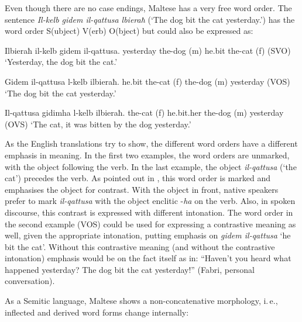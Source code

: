 \begin{multicols}{2}

Even though there are no case endings, Maltese has a very free word order. The sentence \emph{Il-kelb gidem il-qattusa lbieraħ} (`The dog bit the cat yesterday.') has the word order S(ubject) V(erb) O(bject) but could also be expressed as:

\begin{examples}\label{WO_no_clitics_en}
\item
\gll Ilbieraħ il-kelb gidem il-qattusa.
yesterday	{the-dog (m)} he.bit	{the-cat (f)}
\gln (SVO)
\glt `Yesterday, the dog bit the cat.'
\glend

\item
\gll Gidem il-qattusa l-kelb ilbieraħ.
he.bit {the-cat (f)} {the-dog (m)} yesterday
\gln (VOS)
\glt `The dog bit the cat yesterday.'
\glend

\item
\gll Il-qattusa gidimha l-kelb ilbieraħ.
{the-cat (f)} he.bit.her {the-dog (m)} yesterday
\gln (OVS)
\glt `The cat, it was bitten by the dog yesterday.'
\glend
\end{examples}

As the English translations try to show, the different word orders have a different emphasis in meaning. In the first two examples, the word orders are unmarked, with the object following the verb. In the last example, the object \emph{il-qattusa} (`the cat') precedes the verb. As pointed out in \cite[p.~140]{Fabri:1993}, this word order is marked and emphasises the object for contrast. With the object in front, native speakers prefer to mark \emph{il-qattusa} with the object enclitic -\emph{ha} on the verb. Also, in spoken discourse, this contrast is expressed with different intonation. The word order in the second example (VOS) could be used for expressing a contrastive meaning as well, given the appropriate intonation, putting emphasis on \emph{gidem il-qattusa} `he bit the cat'. Without this contrastive meaning (and without the contrastive intonation) emphasis would be on the fact itself as in: ``Haven’t you heard what happened yesterday? The dog bit the cat yesterday!'' (Fabri, personal conversation).


As a Semitic language, Maltese shows a non-concatenative morphology, i.\,e., inflected and derived word forms change internally:


\end{multicols}

